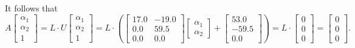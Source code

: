 It follows that
$$A \begin{bmatrix}
\alpha_1\\ \alpha_2\\1
\end{bmatrix} =L\cdot U  \begin{bmatrix}
\alpha_1\\ \alpha_2\\1
\end{bmatrix} = L\cdot \left( \left[
\begin{array}{rr}
17.0 & -19.0 \\
0.0 & 59.5 \\
0.0 & 0.0
\end{array}
\right] \begin{bmatrix}
\alpha_1\\ \alpha_2
\end{bmatrix}+ \left[ \begin{array}{r}
     53.0  \\
     -59.5\\
     0.0
\end{array} \right] \right) =  L\cdot \begin{bmatrix}
0\\ 0 \\ 0
\end{bmatrix}= \begin{bmatrix}
0\\ 0\\0
\end{bmatrix}.$$\\

